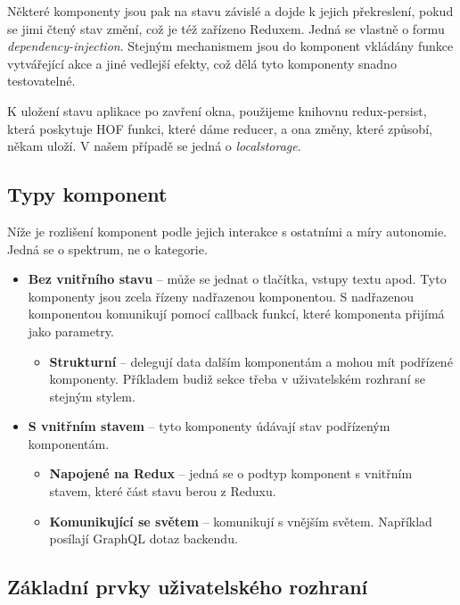 Některé komponenty jsou pak na stavu závislé a dojde k jejich překreslení, pokud se jimi čtený stav změní, což je též zařízeno
Reduxem. Jedná se vlastně o formu \textit{dependency-injection}. Stejným mechanismem jsou do komponent vkládány
funkce vytvářející akce a jiné vedlejší efekty, což dělá tyto komponenty snadno testovatelné.

K uložení stavu aplikace po zavření okna, použijeme knihovnu redux-persist, která poskytuje
HOF funkci, které dáme reducer, a ona změny, které způsobí, někam uloží. \citep[viz][]{reduxpersist}
V našem případě se jedná o \textit{localstorage}.

\subsection{Typy komponent}

\noindent
Níže je rozlišení komponent podle jejich interakce s ostatními a míry autonomie.
Jedná se o spektrum, ne o kategorie.

\begin{itemize}
  \setlength\itemsep{0.05em}
  \item \textbf{Bez vnitřního stavu} -- může se jednat o tlačítka, vstupy textu apod. Tyto komponenty jsou zcela řízeny
      nadřazenou komponentou. S nadřazenou komponentou komunikují pomocí callback funkcí, které komponenta přijímá jako parametry.
  \begin{itemize}
    \setlength\itemsep{0.05em}
    \item \textbf{Strukturní} -- delegují data dalším komponentám a mohou mít podřízené komponenty. Příkladem budiž sekce třeba v 
        uživatelském rozhraní se stejným stylem.
  \end{itemize}
  \item \textbf{S vnitřním stavem} -- tyto komponenty údávají stav podřízeným komponentám.
  \begin{itemize}
    \setlength\itemsep{0.05em}
    \item \textbf{Napojené na Redux} -- jedná se o podtyp komponent s vnitřním stavem, které část stavu berou z Reduxu.
    \item \textbf{Komunikující se světem} --  komunikují s vnějším světem. Například posílají GraphQL dotaz backendu.
  \end{itemize}
\end{itemize}

\subsection{Základní prvky uživatelského rozhraní}

